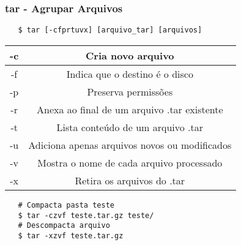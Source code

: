 \documentclass{beamer}
\begin{document}
\begin{frame}[fragile]
   \frametitle{tar - Agrupar Arquivos}
   \begin{verbatim}
   $ tar [-cfprtuvx] [arquivo_tar] [arquivos]
   \end{verbatim}
   \begin{table}
      \begin{tabular}{ c | c }
         -c & Cria novo arquivo \\
         \hline 
         -f & Indica que o destino é o disco \\ 
         \hline
	 -p & Preserva permissões \\
         \hline 
         -r & Anexa ao final de um arquivo .tar existente \\ 
         \hline
         -t & Lista conteúdo de um arquivo .tar \\ 
         \hline
         -u & Adiciona apenas arquivos novos ou modificados  \\
         \hline 
         -v & Mostra o nome de cada arquivo processado \\ 
         \hline
         -x & Retira os arquivos do .tar \\ 
      \end{tabular}
   \end{table}
   \begin{verbatim}
   # Compacta pasta teste
   $ tar -czvf teste.tar.gz teste/
   # Descompacta arquivo
   $ tar -xzvf teste.tar.gz
   \end{verbatim}
\end{frame}
\end{document}

